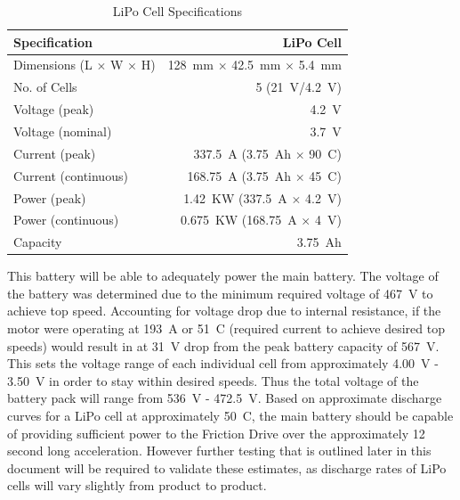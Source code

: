 \documentclass[main.tex]{subfiles}
\begin{document}
    \begin{table}[H]
        \centering
        \begin{tabular}{@{}lr@{}} \toprule
            Specification & LiPo Cell\\ \midrule
            Dimensions (L $\times$ W $\times$ H) & \SI{128}{mm} $\times$ \SI{42.5}{mm} $\times$ \SI{5.4}{mm}\\
            No. of Cells & 5 (\SI{21}{V}/\SI{4.2}{V})\\
            Voltage (peak) & \SI{4.2}{V}\\
            Voltage (nominal) & \SI{3.7}{V}\\
            Current (peak) & \SI{337.5}{A} (\SI{3.75}{Ah} $\times$ \SI{90}{C})\\
            Current (continuous) & \SI{168.75}{A} (\SI{3.75}{Ah} $\times$ \SI{45}{C})\\
            Power (peak) & \SI{1.42}{KW} (\SI{337.5}{A} $\times$ \SI{4.2}{V})\\
            Power (continuous) & \SI{0.675}{KW} (\SI{168.75}{A} $\times$ \SI{4}{V})\\
            Capacity & \SI{3.75}{Ah}\\ \bottomrule
        \end{tabular}
        \caption{LiPo Cell Specifications}
        \label{tab:cell-specs}
    \end{table}

    This battery will be able to adequately power the main battery. The voltage of the battery was determined due to the minimum required voltage of \SI{467}{V} to achieve top speed. Accounting for voltage drop due to internal resistance, if the motor were operating at \SI{193}{A} or \SI{51}{C} (required current to achieve desired top speeds) would result in at \SI{31}{V} drop from the peak battery capacity of \SI{567}{V}. This sets the voltage range of each individual cell from approximately \SI{4.00}{V} - \SI{3.50}{V} in order to stay within desired speeds. Thus the total voltage of the battery pack will range from \SI{536}{V} - \SI{472.5}{V}. Based on approximate discharge curves for a LiPo cell at approximately \SI{50}{C}, the main battery should be capable of providing sufficient power to the Friction Drive over the approximately 12 second long acceleration. However further testing that is outlined later in this document will be required to validate these estimates, as discharge rates of LiPo cells will vary slightly from product to product.\\
\end{document}
